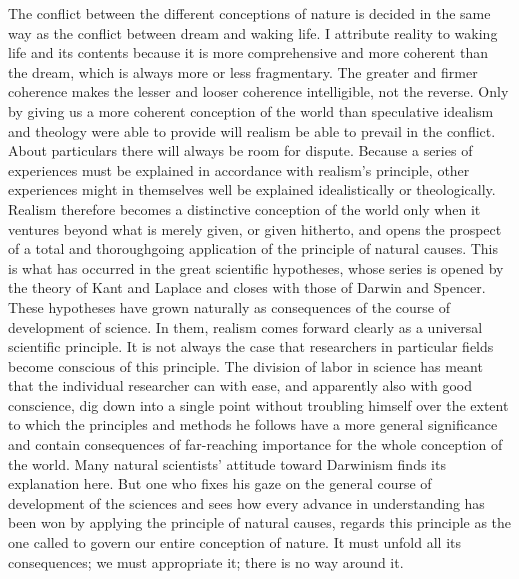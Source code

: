 \documentclass[12pt,a4paper,openany]{book}
\newcommand{\opage}[1]{\marginnote{\footnotesize\textit{[#1]}}}
\begin{document}
The conflict between the different conceptions of nature is decided in the same way as the conflict between dream and waking life. I attribute reality to waking life and its contents because it is more comprehensive and more coherent than the dream, which is always more or less fragmentary. The greater and firmer coherence makes the lesser and looser coherence intelligible, not the reverse. Only by giving us a more coherent conception of the world than speculative idealism and theology were able to provide will realism be able to prevail in the conflict. About particulars there will always be room for dispute. Because a series of experiences must be explained in accordance with realism's principle, other
\opage{6}experiences might in themselves well be explained idealistically or theologically. Realism therefore becomes a distinctive conception of the world only when it ventures beyond what is merely given, or given hitherto, and opens the prospect of a total and thoroughgoing application of the principle of natural causes. This is what has occurred in the great scientific hypotheses, whose series is opened by the theory of Kant and Laplace and closes with those of Darwin and Spencer. These hypotheses have grown naturally as consequences of the course of development of science. In them, realism comes forward clearly as a universal scientific principle. It is not always the case that researchers in particular fields become conscious of this principle. The division of labor in science has meant that the individual researcher can with ease, and apparently also with good conscience, dig down into a single point without troubling himself over the extent to which the principles and methods he follows have a more general significance and contain consequences of far-reaching importance for the whole conception of the world. Many natural scientists' attitude toward Darwinism finds its explanation here. But one who fixes his gaze on the general course of development of the sciences and sees how every advance in understanding has been won by applying the principle of natural causes, regards this principle as the one called to govern our entire conception of nature. It must unfold all its consequences; we must appropriate it; there is no way around it.
\end{document}
